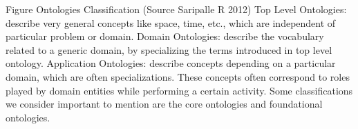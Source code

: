 Figure Ontologies Classification (Source Saripalle R 2012)
Top Level Ontologies: describe very general concepts like space, time, etc., which are independent of particular problem or domain.
Domain Ontologies: describe the vocabulary related to a generic domain, by specializing the terms introduced in top level ontology.
Application Ontologies: describe concepts depending on a particular domain, which are often specializations. These concepts often correspond to roles played by domain entities while performing a certain activity.
Some classifications we consider important to mention are the core ontologies and foundational ontologies.



